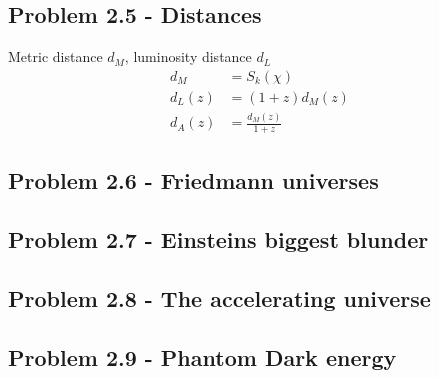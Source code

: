 \documentclass[10pt,a4paper]{book}
\theoremstyle{definition}
\begin{document}
\subsection{Problem 2.5 - Distances}
Metric distance $d_M$, luminosity distance $d_L$ 
\begin{align}
d_M   &=S_k(\chi)\\
d_L(z)&=(1+z)d_M(z)\\
d_A(z)&=\frac{d_M(z)}{1+z}
\end{align}

\subsection{Problem 2.6 - Friedmann universes}
\subsection{Problem 2.7 - Einsteins biggest blunder}
\subsection{Problem 2.8 - The accelerating universe}
\subsection{Problem 2.9 - Phantom Dark energy}
\end{document}
